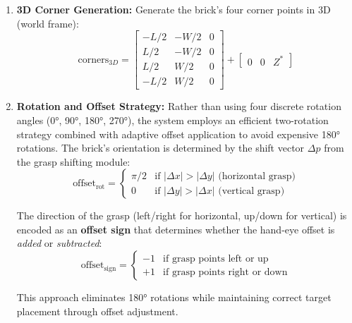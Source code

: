 \begin{enumerate}
    \item \textbf{3D Corner Generation:} Generate the brick's four corner points in 3D (world frame):
    \begin{equation}
        \text{corners}_{3D} = \begin{bmatrix}
            -L/2 & -W/2 & 0 \\
            L/2 & -W/2 & 0 \\
            L/2 & W/2 & 0 \\
            -L/2 & W/2 & 0
        \end{bmatrix} + \begin{bmatrix} 0 & 0 & Z^* \end{bmatrix}
    \end{equation}
    
    \item \textbf{Rotation and Offset Strategy:} Rather than using four discrete rotation angles (0°, 90°, 180°, 270°), the system employs an efficient two-rotation strategy combined with adaptive offset application to avoid expensive 180° rotations. The brick's orientation is determined by the shift vector $\Delta p$ from the grasp shifting module:
    \begin{equation}
        \text{offset}_{\text{rot}} = \begin{cases}
            \pi/2 & \text{if } |\Delta x| > |\Delta y| \text{ (horizontal grasp)} \\
            0 & \text{if } |\Delta y| > |\Delta x| \text{ (vertical grasp)}
        \end{cases}
    \end{equation}
    
    The direction of the grasp (left/right for horizontal, up/down for vertical) is encoded as an \textbf{offset sign} that determines whether the hand-eye offset is \textit{added} or \textit{subtracted}:
    \begin{equation}
        \text{offset}_{\text{sign}} = \begin{cases}
            -1 & \text{if grasp points left or up} \\
            +1 & \text{if grasp points right or down}
        \end{cases}
    \end{equation}
    
    This approach eliminates 180° rotations while maintaining correct target placement through offset adjustment.
    

\end{enumerate}
